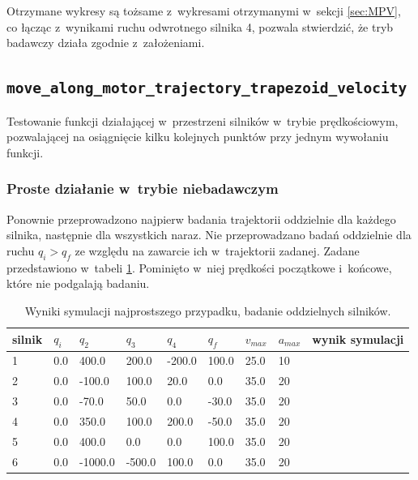 \documentclass[a4paper, 12pt]{article}
\begin{document}
	Otrzymane wykresy są tożsame z~wykresami otrzymanymi w~sekcji \ref{sec:MPV}, co łącząc z~wynikami ruchu odwrotnego silnika 4, pozwala stwierdzić, że tryb badawczy działa zgodnie z~założeniami. 

	\subsection{\texttt{move\_along\_motor\_trajectory\_trapezoid\_velocity}}
	Testowanie funkcji działającej w~przestrzeni silników w~trybie prędkościowym, pozwalającej na osiągnięcie kilku kolejnych punktów przy jednym wywołaniu funkcji. 
	\subsubsection{Proste działanie w~trybie niebadawczym}
	\label{sec:MTV}
	Ponownie przeprowadzono najpierw badania trajektorii oddzielnie dla każdego silnika, następnie dla wszystkich naraz. Nie przeprowadzano badań oddzielnie dla ruchu $ q_i>q_f $ ze względu na zawarcie ich w~trajektorii zadanej. Zadane przedstawiono w~tabeli \ref{tab:setup5}. Pominięto w~niej prędkości początkowe i~końcowe, które nie podgalają badaniu.
	
	\begin{table}[H]
	\centering
	\begin{tabular}{|m{2.5em}|m{3em}|m{3.5em}|m{3em}|m{3em}|m{3em}|m{4em}|m{3em}|m{5em}|}
	\hline
	silnik&$ q_i $ & $ q_2 $ & $ q_3 $ & $q_4$ & $ q_f $ & $ v_{max} $ & $ a_{max} $&wynik symulacji\\
	\hline
	\hline
	\hspace{1em}1& 0.0 & 400.0 & 200.0 & -200.0 & 100.0 & 25.0 & 10&\hspace{2em}\checkmark\\ %
	\hline
	\hspace{1em}2& 0.0 & -100.0 & 100.0 & 20.0 & 0.0 & 35.0 & 20&\hspace{2em}\checkmark\\ %
	\hline
	\hspace{1em}3& 0.0 & -70.0 & 50.0 & 0.0 & -30.0 & 35.0 & 20&\hspace{2em}\checkmark\\ %
	\hline
	\hspace{1em}4& 0.0 & 350.0 & 100.0 & 200.0 & -50.0 & 35.0 & 20&\hspace{2em}\checkmark\\  %
	\hline
	\hspace{1em}5& 0.0 & 400.0 & 0.0 & 0.0 & 100.0 & 35.0 & 20&\hspace{2em}\checkmark\\  %
	\hline
	\hspace{1em}6& 0.0 & -1000.0 & -500.0 & 100.0 & 0.0 & 35.0 & 20&\hspace{2em}\checkmark\\  %
	\hline
	\end{tabular}
	\caption{Wyniki symulacji najprostszego przypadku, badanie oddzielnych silników.}
	\label{tab:setup5}
	\end{table}	
	
\end{document}
